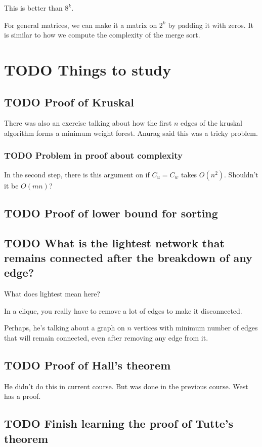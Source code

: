 \documentclass[11pt]{article}
\begin{document}
This is better than \(8^k\).

For general matrices, we can make it a matrix on \(2^k\) by padding it with
zeros. It is similar to how we compute the complexity of the merge sort.
\section{{\bfseries\sffamily TODO} Things to study}
\label{sec:orgc3c26c5}
\subsection{{\bfseries\sffamily TODO} Proof of Kruskal}
\label{sec:org3fc9d03}
There was also an exercise talking about how the first \(n\) edges of the
kruskal algorithm forms a minimum weight forest. Anurag said this was a
tricky problem.
\subsubsection{{\bfseries\sffamily TODO} Problem in proof about complexity}
\label{sec:orge319362}
In the second step, there is this argument on if \(C_u = C_w\) takes \(O(n^2)\).
Shouldn't it be \(O(mn)\)?
\subsection{{\bfseries\sffamily TODO} Proof of lower bound for sorting}
\label{sec:org1a61e0e}
\subsection{{\bfseries\sffamily TODO} What is the lightest network that remains connected after the breakdown of any edge?}
\label{sec:orge1b3b89}
What does lightest mean here? 

In a clique, you really have to remove a lot of edges to make it disconnected.

Perhaps, he's talking about a graph on \(n\) vertices with minimum number of
edges that will remain connected, even after removing any edge from it.
\subsection{{\bfseries\sffamily TODO} Proof of Hall's theorem}
\label{sec:orge582667}
He didn't do this in current course. But was done in the previous course.
West has a proof.
\subsection{{\bfseries\sffamily TODO} Finish learning the proof of Tutte's theorem}
\label{sec:org4af17ef}
\end{document}
